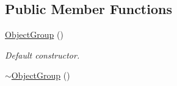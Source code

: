\subsection*{Public Member Functions}
\begin{DoxyCompactItemize}
\item 
\hypertarget{classosea_1_1_object_group_af4d309432161dab231e33e83acaf4161}{\hyperlink{classosea_1_1_object_group_af4d309432161dab231e33e83acaf4161}{Object\-Group} ()}\label{classosea_1_1_object_group_af4d309432161dab231e33e83acaf4161}

\begin{DoxyCompactList}\small\item\em Default constructor. \end{DoxyCompactList}\item 
\hypertarget{classosea_1_1_object_group_a58c2e7cf18338d3fbe47f30fafca3c77}{\hyperlink{classosea_1_1_object_group_a58c2e7cf18338d3fbe47f30fafca3c77}{$\sim$\-Object\-Group} ()}\label{classosea_1_1_object_group_a58c2e7cf18338d3fbe47f30fafca3c77}


\end{DoxyCompactItemize}
